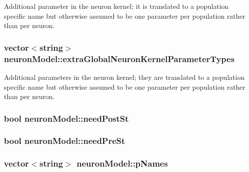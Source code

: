 Additional parameter in the neuron kernel; it is translated to a population specific name but otherwise assumed to be one parameter per population rather than per neuron. 

\hypertarget{structneuronModel_a35592a2fad7d926ca664871bd1513f24}{
\subsubsection[{extra\+Global\+Neuron\+Kernel\+Parameter\+Types}]{\setlength{\rightskip}{0pt plus 5cm}vector$<$string$>$ neuron\+Model\+::extra\+Global\+Neuron\+Kernel\+Parameter\+Types}}\label{structneuronModel_a35592a2fad7d926ca664871bd1513f24}


Additional parameters in the neuron kernel; they are translated to a population specific name but otherwise assumed to be one parameter per population rather than per neuron. 

\hypertarget{structneuronModel_a633acff33b8b640f7a815f357b144117}{
\subsubsection[{need\+Post\+St}]{\setlength{\rightskip}{0pt plus 5cm}bool neuron\+Model\+::need\+Post\+St}}\label{structneuronModel_a633acff33b8b640f7a815f357b144117}
\hypertarget{structneuronModel_aff3d8b2160410c976506e0c4ddf8b6c1}{
\subsubsection[{need\+Pre\+St}]{\setlength{\rightskip}{0pt plus 5cm}bool neuron\+Model\+::need\+Pre\+St}}\label{structneuronModel_aff3d8b2160410c976506e0c4ddf8b6c1}
\hypertarget{structneuronModel_a4a5bf1f757a72b6edc28ad26ed61b2be}{
\subsubsection[{p\+Names}]{\setlength{\rightskip}{0pt plus 5cm}vector$<$string$>$ neuron\+Model\+::p\+Names}}\label{structneuronModel_a4a5bf1f757a72b6edc28ad26ed61b2be}


